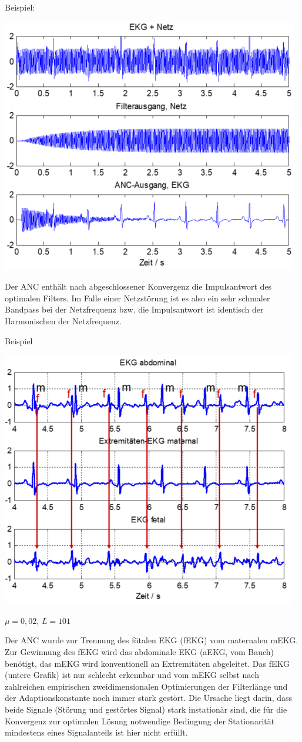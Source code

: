 \documentclass[a4paper]{article}
\begin{document}
\begin{multicols}{3}
  Beispiel:

  \begin{itemize*}
    \item \includegraphics[width=.5\linewidth]{Assets/Biosignalverarbeitung-adaptiver-filter-ekg+netz.png}
    \item Der ANC enthält nach abgeschlossener Konvergenz die Impulsantwort des optimalen Filters. Im Falle einer Netzstörung ist es also ein sehr schmaler Bandpass bei der Netzfrequenz bzw. die Impulsantwort ist identisch der Harmonischen der Netzfrequenz.
  \end{itemize*}

  Beispiel

  \begin{itemize*}
    \item \includegraphics[width=.5\linewidth]{Assets/Biosignalverarbeitung-adaptiver-filter-ekg-abdominal.png}
    \item $\mu=0,02$, $L=101$
    \item Der ANC wurde zur Trennung des fötalen EKG (fEKG) vom maternalen mEKG. Zur Gewinnung des fEKG wird das abdominale EKG (aEKG, vom Bauch) benötigt, das mEKG wird konventionell an Extremitäten abgeleitet. Das fEKG (untere Grafik) ist nur schlecht erkennbar und vom mEKG selbst nach zahlreichen empirischen zweidimensionalen Optimierungen der Filterlänge und der Adaptionskonstante noch immer stark gestört. Die Ursache liegt darin, dass beide Signale (Störung und gestörtes Signal) stark instationär sind, die für die Konvergenz zur optimalen Lösung notwendige Bedingung der Stationarität mindestens eines Signalanteils ist hier nicht erfüllt.
  \end{itemize*}


\end{multicols}
\end{document}
